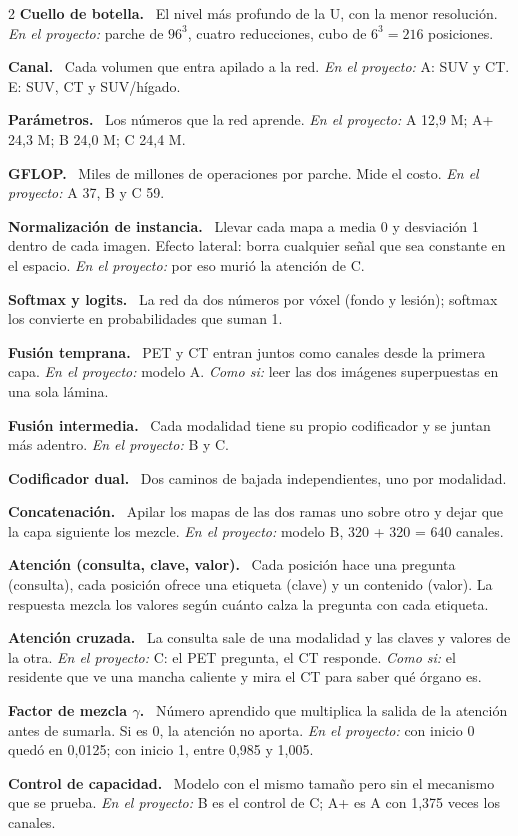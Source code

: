 \documentclass[9pt,a4paper]{extarticle}
\newcommand{\T}[1]{{\sffamily\bfseries\color{tinta}#1.}\ }
\newcommand{\aqui}[1]{{\color{acento}\itshape En el proyecto:} #1}
\newcommand{\como}[1]{{\itshape Como si:} #1}
\begin{document}
\begin{multicols}{2}
\T{Cuello de botella} El nivel más profundo de la U, con la menor resolución. \aqui{parche de $96^3$, cuatro reducciones, cubo de $6^3 = 216$ posiciones.}

\T{Canal} Cada volumen que entra apilado a la red. \aqui{A: SUV y CT. E: SUV, CT y SUV/hígado.}

\T{Parámetros} Los números que la red aprende. \aqui{A 12,9 M; A+ 24,3 M; B 24,0 M; C 24,4 M.}

\T{GFLOP} Miles de millones de operaciones por parche. Mide el costo. \aqui{A 37, B y C 59.}

\T{Normalización de instancia} Llevar cada mapa a media 0 y desviación 1 dentro de cada imagen. Efecto lateral: borra cualquier señal que sea constante en el espacio. \aqui{por eso murió la atención de C.}

\T{Softmax y logits} La red da dos números por vóxel (fondo y lesión); softmax los convierte en probabilidades que suman 1.

\T{Fusión temprana} PET y CT entran juntos como canales desde la primera capa. \aqui{modelo A.} \como{leer las dos imágenes superpuestas en una sola lámina.}

\T{Fusión intermedia} Cada modalidad tiene su propio codificador y se juntan más adentro. \aqui{B y C.}

\T{Codificador dual} Dos caminos de bajada independientes, uno por modalidad.

\T{Concatenación} Apilar los mapas de las dos ramas uno sobre otro y dejar que la capa siguiente los mezcle. \aqui{modelo B, 320 + 320 = 640 canales.}

\T{Atención (consulta, clave, valor)} Cada posición hace una pregunta (consulta), cada posición ofrece una etiqueta (clave) y un contenido (valor). La respuesta mezcla los valores según cuánto calza la pregunta con cada etiqueta.

\T{Atención cruzada} La consulta sale de una modalidad y las claves y valores de la otra. \aqui{C: el PET pregunta, el CT responde.} \como{el residente que ve una mancha caliente y mira el CT para saber qué órgano es.}

\T{Factor de mezcla $\gamma$} Número aprendido que multiplica la salida de la atención antes de sumarla. Si es 0, la atención no aporta. \aqui{con inicio 0 quedó en 0,0125; con inicio 1, entre 0,985 y 1,005.}

\T{Control de capacidad} Modelo con el mismo tamaño pero sin el mecanismo que se prueba. \aqui{B es el control de C; A+ es A con 1,375 veces los canales.}


\end{multicols}
\end{document}

